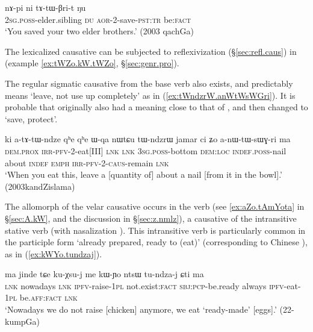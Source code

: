\begin{exe}
\ex \label{ex:tatWBrit}
 \gll nɤ-pi ni tɤ-tɯ-βri-t ŋu \\
\textsc{2sg}.\textsc{poss}-elder.sibling \textsc{du} \textsc{aor}-2-save-\textsc{pst}:\textsc{tr} be:\textsc{fact} \\
\glt `You saved your two elder brothers.' (2003 qachGa)
\end{exe}

The lexicalized causative  can be subjected to reflexivization (§\ref{sec:refl.caus}) in  (example \ref{ex:tWZo.kW.tWZo}, §\ref{sec:genr.pro}). 

The regular sigmatic causative  from the base verb  also exists, and  predictably means  `leave, not use up completely' as in (\ref{ex:tWndzrW.anWtWsWGri}). It is probable that  originally also had a meaning close to that of , and then changed to `save, protect'.   
\largerpage
\begin{exe}
\ex \label{ex:tWndzrW.anWtWsWGri}
 \gll ki a-tɤ-tɯ-ndze qʰe qʰe ɯ-qa nɯtɕu tɯ-ndzrɯ jamar ci ʑo a-nɯ-tɯ-sɯɣ-ri ma \\
 \textsc{dem}.\textsc{prox} \textsc{irr}-\textsc{pfv}-2-eat[III] \textsc{lnk} \textsc{lnk} \textsc{3sg}.\textsc{poss}-bottom \textsc{dem}:\textsc{loc} \textsc{indef}.\textsc{poss}-nail about \textsc{indef} \textsc{emph}  \textsc{irr}-\textsc{pfv}-2-\textsc{caus}-remain \textsc{lnk} \\
\glt `When you eat this, leave a [quantity of] about a nail [from it in the bowl].' (2003kandZislama)
\end{exe}
 
The  allomorph of the velar causative occurs in the verb  (see \ref{ex:aZo.tAmYota} in §\ref{sec:A.kW}, and the discussion in §\ref{sec:z.nmlz}), a causative of the intransitive stative verb  (with nasalization  \fl{} ). This  intransitive verb is particularly common in the participle form  `already prepared, ready to (eat)' (corresponding to Chinese ), as in (\ref{ex:kWYo.tundzaj}).  

\begin{exe}
\ex \label{ex:kWYo.tundzaj}
 \gll ma jinde tɕe ku-χsu-j me kɯ-ɲo ntsɯ tu-ndza-j ɕti ma \\
 \textsc{lnk} nowadays \textsc{lnk} \textsc{ipfv}-raise-\textsc{1pl} not.exist:\textsc{fact} \textsc{sbj}:\textsc{pcp}-be.ready always \textsc{ipfv}-eat-\textsc{1pl} be.\textsc{aff}:\textsc{fact} \textsc{lnk} \\
 \glt `Nowadays we do not raise [chicken] anymore, we eat `ready-made' [eggs].'  (22-kumpGa)
 \end{exe}
 
